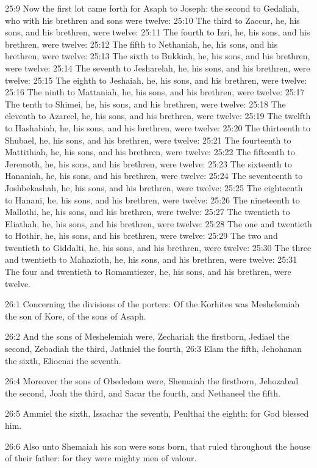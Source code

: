 25:9 Now the first lot came forth for Asaph to Joseph: the second to Gedaliah, who with his brethren and sons were twelve: 25:10 The third to Zaccur, he, his sons, and his brethren, were twelve: 25:11 The fourth to Izri, he, his sons, and his brethren, were twelve: 25:12 The fifth to Nethaniah, he, his sons, and his brethren, were twelve: 25:13 The sixth to Bukkiah, he, his sons, and his brethren, were twelve: 25:14 The seventh to Jesharelah, he, his sons, and his brethren, were twelve: 25:15 The eighth to Jeshaiah, he, his sons, and his brethren, were twelve: 25:16 The ninth to Mattaniah, he, his sons, and his brethren, were twelve: 25:17 The tenth to Shimei, he, his sons, and his brethren, were twelve: 25:18 The eleventh to Azareel, he, his sons, and his brethren, were twelve: 25:19 The twelfth to Hashabiah, he, his sons, and his brethren, were twelve: 25:20 The thirteenth to Shubael, he, his sons, and his brethren, were twelve: 25:21 The fourteenth to Mattithiah, he, his sons, and his brethren, were twelve: 25:22 The fifteenth to Jeremoth, he, his sons, and his brethren, were twelve: 25:23 The sixteenth to Hananiah, he, his sons, and his brethren, were twelve: 25:24 The seventeenth to Joshbekashah, he, his sons, and his brethren, were twelve: 25:25 The eighteenth to Hanani, he, his sons, and his brethren, were twelve: 25:26 The nineteenth to Mallothi, he, his sons, and his brethren, were twelve: 25:27 The twentieth to Eliathah, he, his sons, and his brethren, were twelve: 25:28 The one and twentieth to Hothir, he, his sons, and his brethren, were twelve: 25:29 The two and twentieth to Giddalti, he, his sons, and his brethren, were twelve: 25:30 The three and twentieth to Mahazioth, he, his sons, and his brethren, were twelve: 25:31 The four and twentieth to Romamtiezer, he, his sons, and his brethren, were twelve.

26:1 Concerning the divisions of the porters: Of the Korhites was Meshelemiah the son of Kore, of the sons of Asaph.

26:2 And the sons of Meshelemiah were, Zechariah the firstborn, Jediael the second, Zebadiah the third, Jathniel the fourth, 26:3 Elam the fifth, Jehohanan the sixth, Elioenai the seventh.

26:4 Moreover the sons of Obededom were, Shemaiah the firstborn, Jehozabad the second, Joah the third, and Sacar the fourth, and Nethaneel the fifth.

26:5 Ammiel the sixth, Issachar the seventh, Peulthai the eighth: for God blessed him.

26:6 Also unto Shemaiah his son were sons born, that ruled throughout the house of their father: for they were mighty men of valour.

